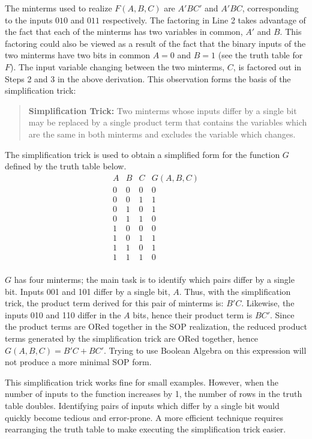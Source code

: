 The minterms used to realize $F(A,B,C)$ are $A'BC'$ and $A'BC$, corresponding 
to the inputs $010$ and $011$ respectively.  The factoring in Line
2 takes advantage of the fact that each of the minterms has two 
variables in common, $A'$ and $B$. This factoring could also be viewed
as a result of the fact that the binary inputs 
of the two minterms have two bits in common $A=0$ and $B=1$ (see 
the truth table for $F$).  The input variable changing between 
the two minterms, $C$, is factored out in Steps 2 and 3 in the above
derivation.  This observation forms the basis of the simplification trick: 


\begin{quote}
\textbf{Simplification Trick:} Two minterms whose inputs differ by a single bit 
may be replaced by
a single product term that contains the variables which are the same in 
both minterms and excludes the variable which changes.  
\end{quote}


The simplification trick is used to obtain a simplified form 
for the function $G$ defined by the truth table below.
$$\begin{array}{c|c|c||c}
A & B & C & G(A,B,C)  \\ \hline
0 & 0 & 0 & 0 \\ \hline
0 & 0 & 1 & 1 \\ \hline
0 & 1 & 0 & 1 \\ \hline
0 & 1 & 1 & 0 \\ \hline
1 & 0 & 0 & 0 \\ \hline
1 & 0 & 1 & 1 \\ \hline
1 & 1 & 0 & 1 \\ \hline
1 & 1 & 1 & 0 \\
\end{array} $$


$G$ has four minterms; the main task is to identify which
pairs differ by a single bit.  Inputs 001 and 101 differ by 
a single bit, $A$.  Thus, with the simplification trick,
the product term derived for this pair of minterms is: $B'C$.  
Likewise, the inputs 010 and 110 differ in the $A$ bits, hence
their product term is $BC'$.  Since the product terms are
ORed together in the SOP realization, the reduced product
terms generated by the simplification trick are ORed together,
hence $G(A,B,C)=B'C+BC'$.  Trying to use Boolean Algebra on 
this expression will not produce a more minimal SOP form.

This simplification trick works fine for small examples.
However, when the number of inputs to the function
increases by 1, the number of rows in the truth table
doubles.  Identifying pairs of inputs which differ
by a single bit would quickly become tedious and error-prone.
A more efficient technique requires rearranging the
truth table to make executing the simplification trick easier.

